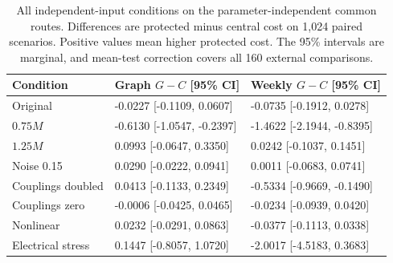 \begin{table}[t]
\centering
\caption{All independent-input conditions on the parameter-independent common routes. Differences are protected minus central cost on 1,024 paired scenarios. Positive values mean higher protected cost. The 95\% intervals are marginal, and mean-test correction covers all 160 external comparisons.}
\label{tab:guarded-external-independent}
\footnotesize\setlength{\tabcolsep}{3pt}\renewcommand{\arraystretch}{1.12}
\begin{tabular}{@{}p{}p{}p{}@{}}
\toprule
Condition & Graph $G-C$ [95\% CI] & Weekly $G-C$ [95\% CI] \\
\midrule
Original & -0.0227 [-0.1109, 0.0607] & -0.0735 [-0.1912, 0.0278] \\
$0.75M$ & -0.6130 [-1.0547, -0.2397] & -1.4622 [-2.1944, -0.8395] \\
$1.25M$ & 0.0993 [-0.0647, 0.3350] & 0.0242 [-0.1037, 0.1451] \\
Noise 0.15 & 0.0290 [-0.0222, 0.0941] & 0.0011 [-0.0683, 0.0741] \\
Couplings doubled & 0.0413 [-0.1133, 0.2349] & -0.5334 [-0.9669, -0.1490] \\
Couplings zero & -0.0006 [-0.0425, 0.0465] & -0.0234 [-0.0939, 0.0420] \\
Nonlinear & 0.0232 [-0.0291, 0.0863] & -0.0377 [-0.1113, 0.0338] \\
Electrical stress & 0.1447 [-0.8057, 1.0720] & -2.0017 [-4.5183, 0.3683] \\
\bottomrule
\end{tabular}
\end{table}
